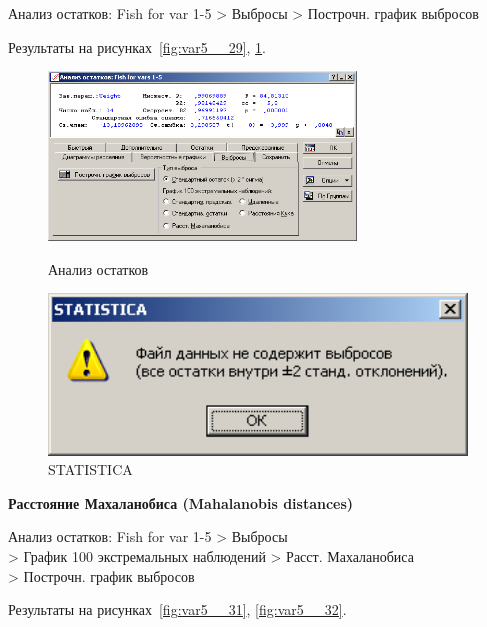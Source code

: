 Анализ остатков: Fish for var 1-5 > Выбросы > Построчн. график выбросов

Результаты на рисунках~\ref{fig:var5__29}, \ref{fig:var5__30}.

\begin{figure}[!h]
  \centering
  \begin{minipage}{0.49\textwidth}
    \centering

    \includegraphics[height=4.5cm]
    {inc/var5__29.PNG}

    \caption{Анализ остатков}
    \label{fig:var5__29}
  \end{minipage}
  \begin{minipage}{0.49\textwidth}
    \centering

    \includegraphics[width=0.99\textwidth]
    {inc/var5__30.PNG}

    \caption{STATISTICA}
    \label{fig:var5__30}
  \end{minipage}
\end{figure}

\textbf{Расстояние Махаланобиса (Mahalanobis distances)}

Анализ остатков: Fish for var 1-5 > Выбросы\\
> График 100 экстремальных наблюдений > Расст. Махаланобиса\\
> Построчн. график выбросов

Результаты на рисунках~\ref{fig:var5__31}, \ref{fig:var5__32}.

